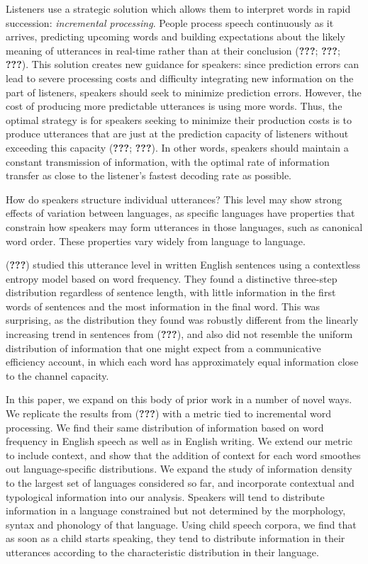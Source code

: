 \documentclass[10pt, letterpaper]{article}
\begin{document}
Listeners use a strategic solution which allows them to interpret words
in rapid succession: \emph{incremental processing}. People process
speech continuously as it arrives, predicting upcoming words and
building expectations about the likely meaning of utterances in
real-time rather than at their conclusion ({\textbf{???}};
{\textbf{???}}; {\textbf{???}}). This solution creates new guidance for
speakers: since prediction errors can lead to severe processing costs
and difficulty integrating new information on the part of listeners,
speakers should seek to minimize prediction errors. However, the cost of
producing more predictable utterances is using more words. Thus, the
optimal strategy is for speakers seeking to minimize their production
costs is to produce utterances that are just at the prediction capacity
of listeners without exceeding this capacity ({\textbf{???}};
{\textbf{???}}). In other words, speakers should maintain a constant
transmission of information, with the optimal rate of information
transfer as close to the listener's fastest decoding rate as possible.

How do speakers structure individual utterances? This level may show
strong effects of variation between languages, as specific languages
have properties that constrain how speakers may form utterances in those
languages, such as canonical word order. These properties vary widely
from language to language.

({\textbf{???}}) studied this utterance level in written English
sentences using a contextless entropy model based on word frequency.
They found a distinctive three-step distribution regardless of sentence
length, with little information in the first words of sentences and the
most information in the final word. This was surprising, as the
distribution they found was robustly different from the linearly
increasing trend in sentences from ({\textbf{???}}), and also did not
resemble the uniform distribution of information that one might expect
from a communicative efficiency account, in which each word has
approximately equal information close to the channel capacity.

In this paper, we expand on this body of prior work in a number of novel
ways. We replicate the results from ({\textbf{???}}) with a metric tied
to incremental word processing. We find their same distribution of
information based on word frequency in English speech as well as in
English writing. We extend our metric to include context, and show that
the addition of context for each word smoothes out language-specific
distributions. We expand the study of information density to the largest
set of languages considered so far, and incorporate contextual and
typological information into our analysis. Speakers will tend to
distribute information in a language constrained but not determined by
the morphology, syntax and phonology of that language. Using child
speech corpora, we find that as soon as a child starts speaking, they
tend to distribute information in their utterances according to the
characteristic distribution in their language.
\end{document}
